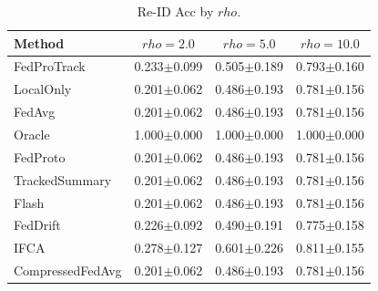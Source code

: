 \begin{table}[t]
\centering
\caption{Re-ID Acc by $rho$.}
\label{tab:rho_concept_re_id_accuracy}
\begin{tabular}{lccc}
\toprule
Method & $rho=2.0$ & $rho=5.0$ & $rho=10.0$ \\
\midrule
FedProTrack & 0.233$\pm$0.099 & 0.505$\pm$0.189 & 0.793$\pm$0.160 \\
LocalOnly & 0.201$\pm$0.062 & 0.486$\pm$0.193 & 0.781$\pm$0.156 \\
FedAvg & 0.201$\pm$0.062 & 0.486$\pm$0.193 & 0.781$\pm$0.156 \\
Oracle & 1.000$\pm$0.000 & 1.000$\pm$0.000 & 1.000$\pm$0.000 \\
FedProto & 0.201$\pm$0.062 & 0.486$\pm$0.193 & 0.781$\pm$0.156 \\
TrackedSummary & 0.201$\pm$0.062 & 0.486$\pm$0.193 & 0.781$\pm$0.156 \\
Flash & 0.201$\pm$0.062 & 0.486$\pm$0.193 & 0.781$\pm$0.156 \\
FedDrift & 0.226$\pm$0.092 & 0.490$\pm$0.191 & 0.775$\pm$0.158 \\
IFCA & 0.278$\pm$0.127 & 0.601$\pm$0.226 & 0.811$\pm$0.155 \\
CompressedFedAvg & 0.201$\pm$0.062 & 0.486$\pm$0.193 & 0.781$\pm$0.156 \\
\bottomrule
\end{tabular}
\end{table}